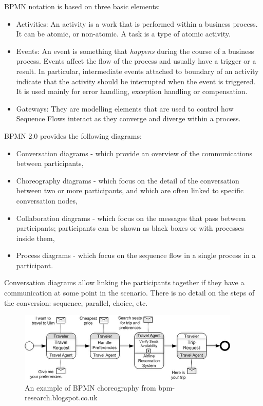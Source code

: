 \documentclass[a4paper,11pt,twoside]{report}
\begin{document}
BPMN notation is based on three basic elements:
\begin{itemize}
\item Activities: An activity is a work that is performed within a business process. It can be atomic, or non-atomic. A task is a type of atomic activity.
\item Events: An event is something that \emph{happens} during the course of a business process. Events affect the flow of the process and usually have a trigger or a result. In particular, intermediate events attached to boundary of an activity indicate that the activity should be interrupted when the event is triggered. It is used mainly for error handling, exception handling or compensation.
\item Gateways: They are modelling elements that are used to control how Sequence Flows interact as they converge and diverge within a process.
\end{itemize}
BPMN 2.0 provides the following diagrams:
\begin{itemize}
\item Conversation diagrams - which provide an overview of the communications between participants,
\item Choreography diagrams - which focus on the detail of the conversation between two or more participants, and which are often linked to specific conversation nodes,
\item Collaboration diagrams - which focus on the messages that pass between participants; participants can be shown as black boxes or with processes inside them,
\item Process diagrams - which focus on the sequence flow in a single process in a participant. 
\end{itemize}
Conversation diagrams allow linking the participants together if they have a communication at some point in the scenario. There is no detail on the steps of the conversion: sequence, parallel, choice, etc.

\begin{figure}[h]
\begin{center}
\includegraphics[scale = 0.7]{bpmn3}
\end{center}
\caption{An example of BPMN choreography from bpm-research.blogspot.co.uk}
\end{figure}
\end{document}
